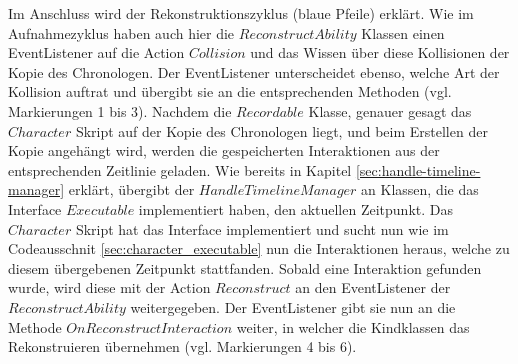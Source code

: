 Im Anschluss wird der Rekonstruktionszyklus (blaue Pfeile) erklärt.
Wie im Aufnahmezyklus haben auch hier die $ReconstructAbility$ Klassen einen EventListener auf die Action $Collision$ und das Wissen über diese Kollisionen der Kopie des Chronologen. Der EventListener unterscheidet ebenso, welche Art der Kollision auftrat und übergibt sie an die entsprechenden Methoden (vgl. Markierungen 1 bis 3). 
Nachdem die $Recordable$ Klasse, genauer gesagt das $Character$ Skript auf der Kopie des Chronologen liegt, und beim Erstellen der Kopie angehängt wird, werden die gespeicherten Interaktionen aus der entsprechenden Zeitlinie geladen. Wie bereits in Kapitel \ref{sec:handle-timeline-manager} erklärt, übergibt der $HandleTimelineManager$ an Klassen, die das Interface $Executable$ implementiert haben, den aktuellen Zeitpunkt. Das $Character$ Skript hat das Interface implementiert und sucht nun wie im Codeausschnit \ref{sec:character_executable} nun die Interaktionen heraus, welche zu diesem übergebenen Zeitpunkt stattfanden. Sobald eine Interaktion gefunden wurde, wird diese mit der Action $Reconstruct$ an den EventListener der $ReconstructAbility$ weitergegeben. Der EventListener gibt sie nun an die Methode $OnReconstructInteraction$ weiter, in welcher die Kindklassen das Rekonstruieren übernehmen (vgl. Markierungen 4 bis 6).

